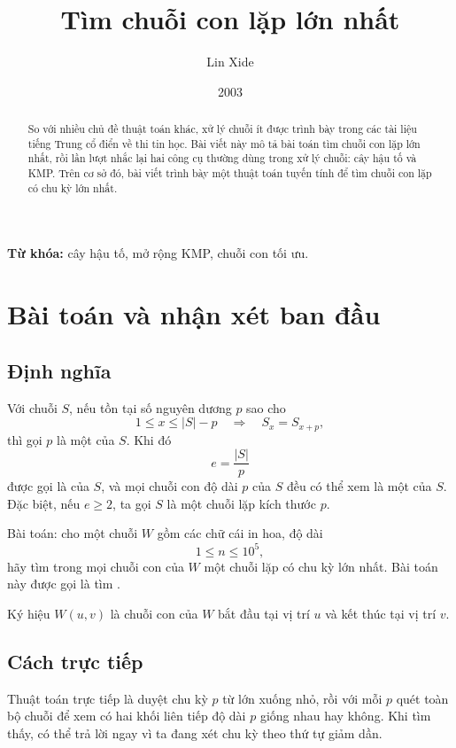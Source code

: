\documentclass[11pt]{article}
\title{Tìm chuỗi con lặp lớn nhất}
\author{Lin Xide}
\date{2003}
\begin{document}
\maketitle


\begin{abstract}
So với nhiều chủ đề thuật toán khác, xử lý chuỗi ít được trình bày trong các
tài liệu tiếng Trung cổ điển về thi tin học. Bài viết này mô tả bài toán tìm
chuỗi con lặp lớn nhất, rồi lần lượt nhắc lại hai công cụ thường dùng trong
xử lý chuỗi: cây hậu tố và KMP. Trên cơ sở đó, bài viết trình bày một thuật
toán tuyến tính để tìm chuỗi con lặp có chu kỳ lớn nhất.
\end{abstract}

\noindent\textbf{Từ khóa:} cây hậu tố, mở rộng KMP, chuỗi con tối ưu.

\section{Bài toán và nhận xét ban đầu}

\subsection{Định nghĩa}

Với chuỗi \(S\), nếu tồn tại số nguyên dương \(p\) sao cho
\[
  1\le x\le |S|-p \quad\Longrightarrow\quad S_x=S_{x+p},
\]
thì gọi \(p\) là một  của \(S\). Khi đó
\[
  e=\frac{|S|}{p}
\]
được gọi là  của \(S\), và mọi chuỗi con độ dài \(p\) của \(S\)
đều có thể xem là một  của \(S\). Đặc biệt, nếu \(e\ge 2\),
ta gọi \(S\) là một chuỗi lặp kích thước \(p\).

Bài toán: cho một chuỗi \(W\) gồm các chữ cái in hoa, độ dài
\[
  1\le n\le 10^5,
\]
hãy tìm trong mọi chuỗi con của \(W\) một chuỗi lặp có chu kỳ lớn nhất. Bài
toán này được gọi là tìm .

Ký hiệu \(W(u,v)\) là chuỗi con của \(W\) bắt đầu tại vị trí \(u\) và kết
thúc tại vị trí \(v\).

\subsection{Cách trực tiếp}

Thuật toán trực tiếp là duyệt chu kỳ \(p\) từ lớn xuống nhỏ, rồi với mỗi
\(p\) quét toàn bộ chuỗi để xem có hai khối liên tiếp độ dài \(p\) giống nhau
hay không. Khi tìm thấy, có thể trả lời ngay vì ta đang xét chu kỳ theo thứ tự
giảm dần.
\end{document}
